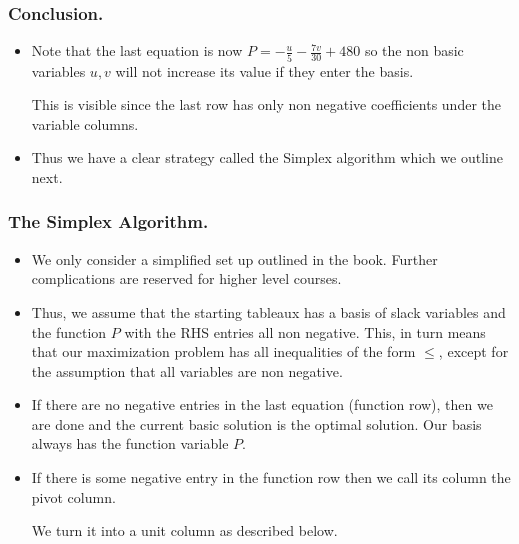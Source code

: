 \begin{frame}%
  \frametitle{Conclusion.}
  \begin{itemize}%
\item Note that the last equation is now
$P=-\frac{u}{5}-\frac{7v}{30}+480$ so the non basic variables $u,v$ will not
increase its value if they enter the basis.

This is visible since the last row has only non negative coefficients
under the variable columns.


\item Thus we have a clear strategy called the Simplex algorithm which
we outline next.

\end{itemize}
\end{frame}


\begin{frame}%
  \frametitle{ The Simplex Algorithm.}
  \begin{itemize}%

\item We only consider a simplified set up outlined in the book. Further
complications are reserved for higher level courses.
\item Thus, we assume that the starting tableaux has a basis of slack
variables and the function $P$ with the RHS entries all non negative.
This, in turn means that our maximization problem has all inequalities
of the form $\le$, except for the assumption that all variables are non
negative.
\item If there are no negative entries in the last equation (function
row), then we are done and the current basic solution is the optimal
solution. Our basis always has the function variable $P$.
\item If there is some negative entry in the function row then we call
its column the pivot column.

We turn it into a unit column as described below.

\end{itemize}
\end{frame}

